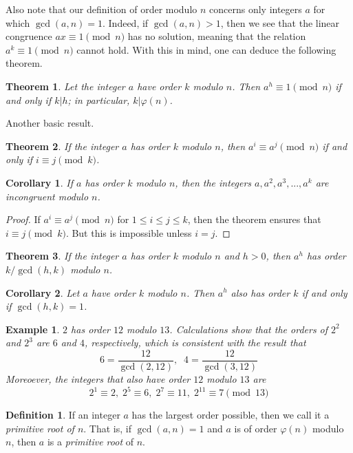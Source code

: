 \documentclass{article}
\newtheorem{theorem}{Theorem}[section]
\newtheorem{example}{Example}[section]
\newtheorem{corollary}{Corollary}[theorem]
\theoremstyle{remark}
\theoremstyle{definition}
\newtheorem{definition}{Definition}[section]
\begin{document}
Also note that our definition of order modulo $n$ concerns only integers $a$ for which $\gcd(a, n) = 1$. Indeed, if $\gcd(a, n) >1$, then we see that the linear congruence $ax \equiv 1 \pmod{n}$ has no solution, meaning that the relation $a^k \equiv 1 \pmod{n}$ cannot hold. With this in mind, one can deduce the following theorem. 

\begin{theorem}
Let the integer $a$ have order $k$ modulo $n$. Then $a^h \equiv 1 \pmod{n}$ if and only if $k|h$; in particular, $k|\varphi(n)$. 
\end{theorem}

Another basic result. 

\begin{theorem}
If the integer $a$ has order $k$ modulo $n$, then $a^i \equiv a^j \pmod{n}$ if and only if $i \equiv j \pmod{k}$. 
\end{theorem}

\begin{corollary}
If $a$ has order $k$ modulo $n$, then the integers $a, a^2, a^3, ..., a^k$ are incongruent modulo $n$. 
\end{corollary}
\begin{proof}
If $a^i \equiv a^j \pmod{n}$ for $1 \leq i \leq j \leq k$, then the theorem ensures that $i \equiv j \pmod{k}$. But this is impossible unless $i = j$. 
\end{proof}

\begin{theorem}
If the integer $a$ has order $k$ modulo $n$ and $h>0$, then $a^h$ has order $k/\gcd(h, k)$ modulo $n$. 
\end{theorem}

\begin{corollary}
Let $a$ have order $k$ modulo $n$. Then $a^h$ also has order $k$ if and only if $\gcd(h, k) = 1$. 
\end{corollary}

\begin{example}
$2$ has order $12$ modulo $13$. Calculations show that the orders of $2^2$ and $2^3$ are $6$ and $4$, respectively, which is consistent with the result that
\[6 = \frac{12}{\gcd(2, 12)}, \;\; 4 = \frac{12}{\gcd(3, 12)}\]
Moreoever, the integers that also have order $12$ modulo $13$ are 
\[2^1 \equiv 2, \; 2^5 \equiv 6, \; 2^7 \equiv 11, \; 2^{11} \equiv 7 \pmod{13}\]
\end{example}

\begin{definition}
If an integer $a$ has the largest order possible, then we call it a \textit{primitive root of $n$}. That is, if $\gcd(a, n) = 1$ and $a$ is of order $\varphi(n)$ modulo $n$, then $a$ is a \textit{primitive root} of $n$. 
\end{definition}
\end{document}
